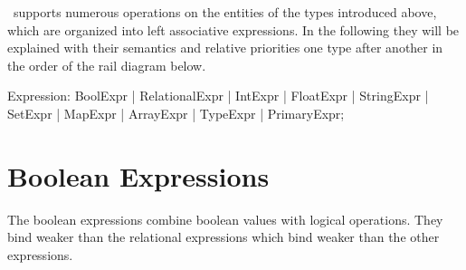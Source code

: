 \GrG~supports numerous operations on the entities of the types introduced above, which are organized into left associative expressions.
In the following they will be explained with their semantics and relative priorities one type after another in the order of the rail diagram below.

\begin{rail}
  Expression: BoolExpr | RelationalExpr | IntExpr | FloatExpr | StringExpr | SetExpr | MapExpr | ArrayExpr | TypeExpr | PrimaryExpr;
\end{rail}


\section{Boolean Expressions}

The boolean expressions combine boolean values with logical operations.
They bind weaker than the relational expressions which bind weaker than the other expressions.

